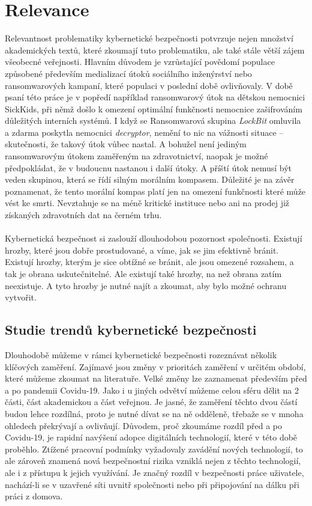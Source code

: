 \section{Relevance}\label{sec:relevance}
Relevantnost problematiky kybernetické bezpečnosti potvrzuje nejen množství akademických textů, které zkoumají tuto problematiku, ale také stále větší zájem všeobecné veřejnosti.
Hlavním důvodem je vzrůstající povědomí populace způsobené především medializací útoků sociálního inženýrství nebo ransomwarových kampaní, které populaci v poslední době ovlivňovaly.
V době psaní této práce je v popředí například ransomwarový útok na dětskou nemocnici SickKids, při němž došlo k omezení optimální funkčnosti nemocnice zašifrováním důležitých interních systémů.\cite{bleep_sickkids_ransom}
I když se Ransomwarová skupina \textit{LockBit} omluvila a zdarma poskytla nemocnici \textit{decryptor}, nemění to nic na vážnosti situace – skutečnosti, že takový útok vůbec nastal.
A bohužel není jediným ransomwarovým útokem zaměřeným na zdravotnictví, naopak je možné předpokládat, že v budoucnu nastanou i další útoky.
A příští útok nemusí být veden skupinou, která se řídí silným morálním kompasem.
Důležité je na závěr poznamenat, že tento morální kompas platí jen na omezení funkčnosti které může vést ke smrti.
Nevztahuje se na méně kritické instituce nebo ani na prodej již získaných zdravotních dat na černém trhu.

\paragraph{}
Kybernetická bezpečnost si zaslouží dlouhodobou pozornost společnosti.
Existují hrozby, které jsou dobře prostudované, a víme, jak se jim efektivně bránit.
Existují hrozby, kterým je sice obtížné se bránit, ale jsou omezené rozsahem, a tak je obrana uskutečnitelné.
Ale existují také hrozby, na než obrana zatím neexistuje.
A tyto hrozby je nutné najít a zkoumat, aby bylo možné ochranu vytvořit.

\subsection{Studie trendů kybernetické bezpečnosti}\label{subsec:studie-trendu-kyberneticke-bezpecnosti}
Dlouhodobě můžeme v rámci kybernetické bezpečnosti rozeznávat několik klíčových zaměření.
Zajímavé jsou změny v prioritách zaměření v určitém období, které můžeme zkoumat na literatuře.
Velké změny lze zaznamenat především před a po pandemii Covidu-19.\cite{KUMAR2022102821}
Jako i u jiných odvětví můžeme celou sféru dělit na 2 části, část akademickou a část veřejnou.
Je jasné, že zaměření těchto dvou částí budou lehce rozdílná, proto je nutné dívat se na ně odděleně, třebaže se v mnoha ohledech překrývají a ovlivňují.
Důvodem, proč zkoumáme rozdíl před a po Covidu-19, je rapidní navýšení adopce digitálních technologií, které v této době proběhlo.
Ztížené pracovní podmínky vyžadovaly zavádění nových technologií, to ale zároveň znamená nová bezpečnostní rizika vzniklá nejen z těchto technologií, ale i z přístupu k jejich využívání.
Je značný rozdíl v bezpečnosti práce uživatele, nachází-li se v uzavřené síti uvnitř společnosti nebo při připojování na dálku při práci z domova.

